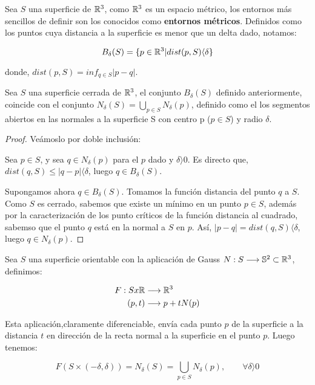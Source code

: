 Sea $S$ una superficie de $\mathbb{R}^3$, como $\mathbb{R}^3$ es un espacio métrico, los entornos más sencillos de definir son los conocidos como \textbf{entornos métricos}. Definidos como los puntos cuya distancia a la superficie es menor que un delta dado, notamos:

\begin{equation*}
    B_\delta(S)=\{p\in \mathbb{R}^3 | dist(p,S)  \langle  \delta\}
\end{equation*}

donde, $dist(p,S) = inf_{q\in S}|p-q|$.

\begin{lemma}
Sea $S$ una superficie cerrada de $\mathbb{R}^3$, el conjunto $B_\delta(S)$ definido anteriormente, coincide con el conjunto $N_\delta(S)=\bigcup_{p\in S}N_\delta(p)$, definido como el los segmentos abiertos en las normales a la superficie S con centro p ($p \in S$) y radio $\delta$.
\end{lemma}
\begin{proof}
Veámoslo por doble inclusión:

Sea $p \in S$, y sea $q \in N_\delta(p)$ para el $p$ dado y $\delta  \rangle  0$. Es directo que, $dist(q,S) \leq |q-p|  \langle  \delta$, luego $q \in B_\delta(S)$.

Supongamos ahora $q \in B_\delta(S)$. Tomamos la función distancia del punto $q$ a $S$. Como $S$ es cerrado, sabemos que existe un mínimo en un punto $p \in S$, además por la caracterización de los punto críticos de la función distancia al cuadrado, sabemso que el punto $q$ está en la normal a $S$ en $p$. Así, $|p-q| = dist(q,S)  \langle  \delta$, luego $q \in N_\delta(p)$.
\end{proof}

Sea $S$ una superficie orientable con la aplicación de Gauss $N: S \longrightarrow \mathbb{S}^2 \subset \mathbb{R}^3$, definimos:

\begin{align*}
    F: S x \mathbb{R} &\longrightarrow \mathbb{R}^3 \\
    (p,t) &\longrightarrow p + tN(p)
\end{align*}

Esta aplicación,claramente diferenciable, envía cada punto $p$ de la superficie a la distancia $t$ en dirección de la recta normal a la superficie en el punto $p$. Luego tenemos:

\begin{equation*}
    F(S \times (-\delta, \delta)) = N_\delta(S)=\bigcup_{p\in S} N_\delta(p), \qquad \forall \delta  \rangle  0
\end{equation*}

